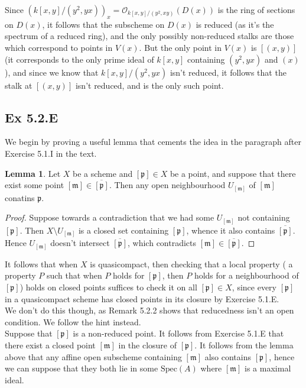 \documentclass{article}
\theoremstyle{definition}
\newtheorem{lemma}[theorem]{Lemma}
\newcommand{\Spec}{\text{Spec}}
\begin{document}
Since $(k[x, y]/(y^2, yx))_x = \mathcal{O}_{k[x, y]/(y^2, xy)}(D(x))$ is the
ring of sections on $D(x)$, it follows that the subscheme on $D(x)$ is reduced
(as it's the spectrum of a reduced ring), and the only possibly non-reduced
stalks are those which correspond to points in $V(x)$. But the only point in
$V(x)$ is $[(x, y)]$ (it corresponds to the only prime ideal of $k[x, y]$
containing $(y^2, yx)$ and $(x)$), and since we know that $k[x, y]/(y^2, yx)$
isn't reduced, it follows that the stalk at $[(x, y)]$ isn't reduced, and is
the only such point.

\subsection*{Ex 5.2.E}

We begin by proving a useful lemma that cements the idea in the paragraph after
Exercise 5.1.I in the text.

\begin{lemma}
	Let $X$ be a scheme and $[\mathfrak{p}] \in X$ be a point, and suppose that
	there exist some point $[\mathfrak{m}] \in \overline{[\mathfrak{p}]}$. Then
	any open neighbourhood $U_{[\mathfrak{m}]}$ of $[\mathfrak{m}]$ conatins
	$\mathfrak{p}$. 
\end{lemma}
\begin{proof}
	Suppose towards a contradiction that we had some $U_{[\mathfrak{m}]}$ not
	containing $[\mathfrak{p}]$. Then $X \setminus U_{[\mathfrak{m}]}$ is a
	closed set containing $[\mathfrak{p}]$, whence it also contains
	$\overline{[\mathfrak{p}]}$. Hence $U_{[\mathfrak{m}]}$ doesn't intersect
	$\overline{[\mathfrak{p}]}$, which contradicts $[\mathfrak{m}] \in
	\overline{[\mathfrak{p}]}$.
\end{proof}

It follows that when $X$ is quasicompact, then checking that a local property (
a property $P$ such that when $P$ holds for $[\mathfrak{p}]$, then $P$ holds
for a neighbourhood of $[\mathfrak{p}]$) holds on closed points suffices to
check it on all $[\mathfrak{p}] \in X$, since every $[\mathfrak{p}]$ in a
quasicompact scheme has closed points in its closure by Exercise 5.1.E. \\

We don't do this though, as Remark 5.2.2 shows that reducedness isn't an open
condition. We follow the hint instead. \\

Suppose that $[\mathfrak{p}]$ is a non-reduced point. It follows from Exercise
5.1.E that there exist a closed point $[\mathfrak{m}]$ in the closure of
$[\mathfrak{p}]$. It follows from the lemma above that any affine open
subscheme containing $[\mathfrak{m}]$ also contains $[\mathfrak{p}]$, hence we
can suppose that they both lie in some $\Spec(A)$ where $[\mathfrak{m}]$ is a
maximal ideal. \\
\end{document}
